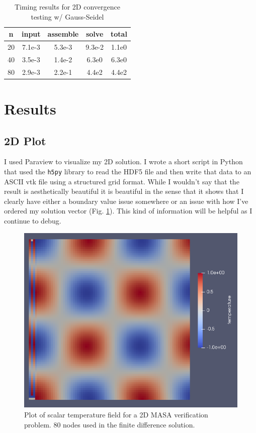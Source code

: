 \documentclass[letterpaper,12pt]{article}
\begin{document}
\begin{table}[h]
\label{tab:2Dtime}
\caption{Timing results for 2D convergence testing w/ Gauss-Seidel}
\begin{center}
\begin{tabular}{| c | c | c | c || c |}
\hline
n &input &assemble &solve & total \\ \hline \hline
 20 &7.1e-3 &5.3e-3 &9.3e-2 & 1.1e0\\ \hline
 40 &3.5e-3 &1.4e-2 &6.3e0 & 6.3e0\\ \hline
 80 &2.9e-3 &2.2e-1 &4.4e2 & 4.4e2\\ \hline
\end{tabular}
\end{center}
\end{table}

\section{Results}
\subsection{2D Plot}
I used Paraview to visualize my 2D solution. I wrote a short script in Python that used the \verb|h5py| library to read the HDF5 file and then write that data to an ASCII vtk file using a structured grid format. While I wouldn't say that the result is aesthetically beautiful it is beautiful in the sense that it shows that I clearly have either a boundary value issue somewhere or an issue with how I've ordered my solution vector (Fig. \ref{fig:2dplot}). This kind of information will be helpful as I continue to debug.

\begin{figure}[h]
\centering
\label{fig:2dplot}
\includegraphics[width=.8 \textwidth]{2dplot.PNG}
\caption{Plot of scalar temperature field for a 2D MASA verification problem. 80 nodes used in the finite difference solution.}
\end{figure}
\end{document}
